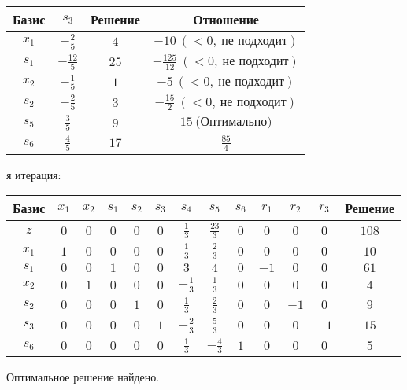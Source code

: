 \documentclass{article}%
\begin{document}
\begin{flushleft}
\newline%
\begin{tabular}{|cccc|}%
\hline%
Базис&$s_{3}$&Решение&Отношение\\%
\hline%
$x_{1}$&$-\frac{2}{5}$&$4$&$-10\: (< 0, \: \text{не подходит})$\\%
$s_{1}$&$-\frac{12}{5}$&$25$&$-\frac{125}{12}\: (< 0, \: \text{не подходит})$\\%
$x_{2}$&$-\frac{1}{5}$&$1$&$-5\: (< 0, \: \text{не подходит})$\\%
$s_{2}$&$-\frac{2}{5}$&$3$&$-\frac{15}{2}\: (< 0, \: \text{не подходит})$\\%
$s_{5}$&$\frac{3}{5}$&$9$&$15\: \text{(Оптимально)}$\\%
$s_{6}$&$\frac{4}{5}$&$17$&$\frac{85}{4}$\\%
\hline%
\end{tabular}%
\newline%
\newline%
я итерация: %
\newline%
\newline%
\renewcommand{\arraystretch}{1.3}%
\begin{tabular}{|c|ccccccccccc|c|}%
\hline%
Базис&$x_{1}$&$x_{2}$&$s_{1}$&$s_{2}$&$s_{3}$&$s_{4}$&$s_{5}$&$s_{6}$&$r_{1}$&$r_{2}$&$r_{3}$&Решение\\%
\hline%
$z$&$0$&$0$&$0$&$0$&$0$&$\frac{1}{3}$&$\frac{23}{3}$&$0$&$0$&$0$&$0$&$108$\\%
\hline%
$x_{1}$&$1$&$0$&$0$&$0$&$0$&$\frac{1}{3}$&$\frac{2}{3}$&$0$&$0$&$0$&$0$&$10$\\%
$s_{1}$&$0$&$0$&$1$&$0$&$0$&$3$&$4$&$0$&$-1$&$0$&$0$&$61$\\%
$x_{2}$&$0$&$1$&$0$&$0$&$0$&$-\frac{1}{3}$&$\frac{1}{3}$&$0$&$0$&$0$&$0$&$4$\\%
$s_{2}$&$0$&$0$&$0$&$1$&$0$&$\frac{1}{3}$&$\frac{2}{3}$&$0$&$0$&$-1$&$0$&$9$\\%
$s_{3}$&$0$&$0$&$0$&$0$&$1$&$-\frac{2}{3}$&$\frac{5}{3}$&$0$&$0$&$0$&$-1$&$15$\\%
$s_{6}$&$0$&$0$&$0$&$0$&$0$&$\frac{1}{3}$&$-\frac{4}{3}$&$1$&$0$&$0$&$0$&$5$\\%
\hline%
\end{tabular}%
\newline%
\end{flushleft}%
Оптимальное решение найдено.%
\newline%
\end{document}
